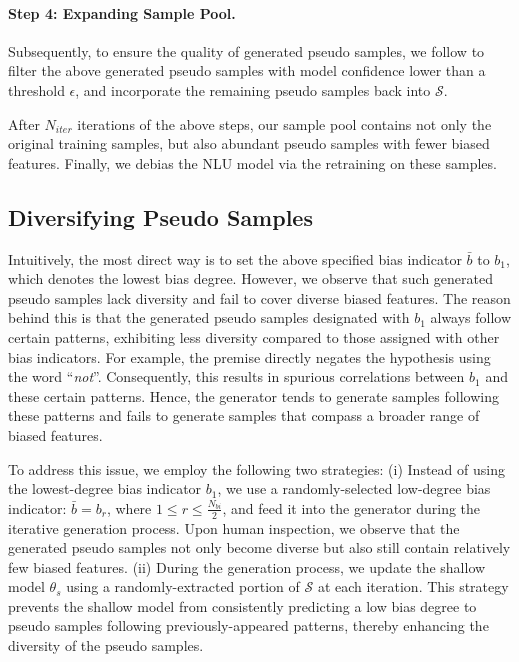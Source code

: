 \documentclass[11pt]{article}
\begin{document}
\paragraph{\indent Step 4: Expanding Sample Pool.}
Subsequently, to ensure the quality of generated pseudo samples, we follow \citet{wu2022generating} to filter the above generated pseudo samples with model confidence lower than a threshold $\epsilon$, and incorporate the remaining pseudo samples back into $\mathcal{S}$.


After $N_{iter}$ iterations of the above steps, our sample pool contains not only the original training samples, but also abundant pseudo samples with fewer biased features. Finally, we debias the NLU model via the retraining on these samples.  





\subsection{Diversifying Pseudo Samples}
\label{sec:diversifying}
Intuitively, the most direct way is to set the above specified bias indicator $\bar b$ to $b_1$, which denotes the lowest bias degree. However, we observe that such generated pseudo samples lack diversity and fail to cover diverse biased features. The reason behind this is that the generated pseudo samples designated with $b_1$ always follow certain patterns, exhibiting less diversity compared to those assigned with other bias indicators. 
For example, the premise directly negates the hypothesis using the word ``\emph{not}''. 
Consequently, this results in spurious correlations between $b_1$ and these certain patterns.
Hence, the generator tends to generate samples following these patterns and fails to generate samples that compass a broader range of biased features.

To address this issue, we employ the following two strategies:
(i) Instead of using the lowest-degree bias indicator $b_1$, we use a randomly-selected low-degree bias indicator: $\bar b$$=$$b_r$, where $1$$\leq$$r$$\leq$$\frac{N_{bi}}{2}$, and feed it into the generator during the iterative generation process. Upon human inspection, we observe that the generated pseudo samples not only become diverse but also still contain relatively few biased features. 
(ii) During the generation process, we update the shallow model $
\theta_s$ using a randomly-extracted portion of $\mathcal S$ at each iteration. This strategy prevents the shallow model from consistently predicting a low bias degree to pseudo samples following previously-appeared patterns, thereby enhancing the diversity of the pseudo samples.
\end{document}
